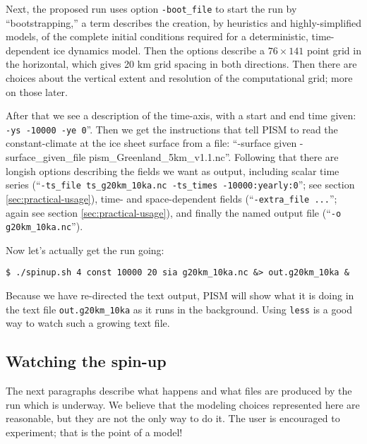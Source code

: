 Next, the proposed run uses option \texttt{-boot_file} to start the run by ``bootstrapping,'' a term describes the creation, by heuristics and highly-simplified models, of the complete initial conditions required for a deterministic, time-dependent ice dynamics model.  Then the options describe a $76\times 141$ point grid in the horizontal, which gives 20 km grid spacing in both directions.  Then there are choices about the vertical extent and resolution of the computational grid; more on those later.

After that we see a description of the time-axis, with a start and end time given: \texttt{-ys -10000 -ye 0}''.  Then we get the instructions that tell PISM to read the constant-climate at the ice sheet surface from a file: ``-surface given -surface_given_file pism_Greenland_5km_v1.1.nc''.  Following that there are longish options describing the fields we want as output, including scalar time series (``\texttt{-ts_file ts_g20km_10ka.nc -ts_times -10000:yearly:0}''; see section \ref{sec:practical-usage}), time- and space-dependent fields (``\texttt{-extra_file ...}''; again see section \ref{sec:practical-usage}), and finally the named output file (``\texttt{-o g20km_10ka.nc}'').

Now let's actually get the run going:
\begin{verbatim}
$ ./spinup.sh 4 const 10000 20 sia g20km_10ka.nc &> out.g20km_10ka &
\end{verbatim}
\noindent Because we have re-directed the text output, PISM will show what it is doing in the text file \texttt{out.g20km_10ka} as it runs in the background.  Using \texttt{less} is a good way to watch such a growing text file.



\subsection{Watching the spin-up}  \label{subsect:spinupsketch}  The next paragraphs describe what happens and what files are produced by the run which is underway.  We believe that the modeling choices represented here are reasonable, but they are not the only way to do it.  The user is encouraged to experiment; that is the point of a model!


